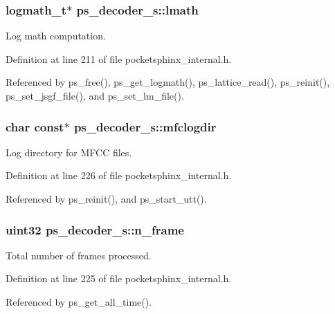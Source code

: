 \subsubsection[{lmath}]{\setlength{\rightskip}{0pt plus 5cm}logmath\-\_\-t$\ast$ ps\-\_\-decoder\-\_\-s\-::lmath}\label{structps__decoder__s_abd17fe329f2fb219c5a534f3217c5b95}


Log math computation. 



Definition at line 211 of file pocketsphinx\-\_\-internal.\-h.



Referenced by ps\-\_\-free(), ps\-\_\-get\-\_\-logmath(), ps\-\_\-lattice\-\_\-read(), ps\-\_\-reinit(), ps\-\_\-set\-\_\-jsgf\-\_\-file(), and ps\-\_\-set\-\_\-lm\-\_\-file().

\subsubsection[{mfclogdir}]{\setlength{\rightskip}{0pt plus 5cm}char const$\ast$ ps\-\_\-decoder\-\_\-s\-::mfclogdir}\label{structps__decoder__s_a8bb5ef8791798b8dd9bc82b1ec016663}


Log directory for M\-F\-C\-C files. 



Definition at line 226 of file pocketsphinx\-\_\-internal.\-h.



Referenced by ps\-\_\-reinit(), and ps\-\_\-start\-\_\-utt().

\subsubsection[{n\-\_\-frame}]{\setlength{\rightskip}{0pt plus 5cm}uint32 ps\-\_\-decoder\-\_\-s\-::n\-\_\-frame}\label{structps__decoder__s_a2886b321c576c7def449ebb2f37899fd}


Total number of frames processed. 



Definition at line 225 of file pocketsphinx\-\_\-internal.\-h.



Referenced by ps\-\_\-get\-\_\-all\-\_\-time().

